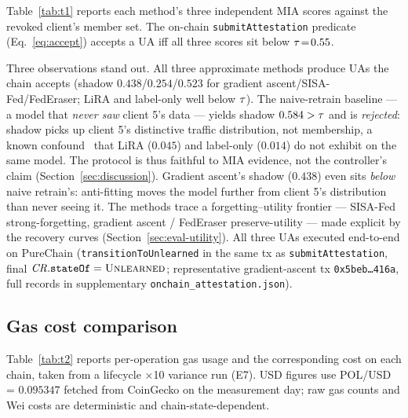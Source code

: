 Table~\ref{tab:t1} reports each method's three independent MIA
scores against the revoked client's member set. The on-chain
\texttt{submitAttestation} predicate (Eq.~\ref{eq:accept}) accepts a
UA iff all three scores sit below $\tau\!=\!0.55$.

\begin{table}[t]
\centering
\caption{Table 1 --- Unlearning effectiveness (E6). MIA scores
against the revoked client's training data, evaluated on the
post-unlearning model. The on-chain gate accepts a UA iff all
three are below $\tauMIA = 0.55$.}
\label{tab:t1}
\footnotesize
\setlength{\tabcolsep}{4pt}
\resizebox{\columnwidth}{!}{}
\end{table}

Three observations stand out. All three approximate methods produce
UAs the chain accepts (shadow $0.438$/$0.254$/$0.523$ for gradient
ascent/SISA-Fed/FedEraser; LiRA and label-only well below
$\tau$). The naive-retrain baseline --- a model that
\emph{never saw} client 5's data --- yields shadow $0.584 >
\tau$ and is \emph{rejected}: shadow picks up client 5's
distinctive traffic distribution, not membership, a known
confound~\cite{shokri2017mia} that LiRA ($0.045$) and label-only
($0.014$) do not exhibit on the same model. The protocol is thus
faithful to MIA evidence, not the controller's claim
(Section~\ref{sec:discussion}). Gradient ascent's shadow ($0.438$) even
sits \emph{below} naive retrain's: anti-fitting moves the model
further from client 5's distribution than never seeing it. The
methods trace a forgetting--utility frontier --- SISA-Fed
strong-forgetting, gradient ascent / FedEraser preserve-utility ---
made explicit by the recovery curves (Section~\ref{sec:eval-utility}).
All three UAs executed end-to-end on PureChain
(\texttt{transitionToUnlearned} in the same tx as
\texttt{submitAttestation}, final
$\mathit{CR}.\mathtt{stateOf}=\textsc{Unlearned}$; representative
gradient-ascent tx \texttt{0x5beb\ldots 416a}, full records in
supplementary \texttt{onchain\_attestation.json}).

\subsection{Gas cost comparison}
\label{sec:eval-gas}

Table~\ref{tab:t2} reports per-operation gas usage and the
corresponding cost on each chain, taken from a lifecycle ×10
variance run (E7). USD figures use POL/USD = $0.095347$ fetched
from CoinGecko on the measurement day; raw gas counts and Wei
costs are deterministic and chain-state-dependent.

